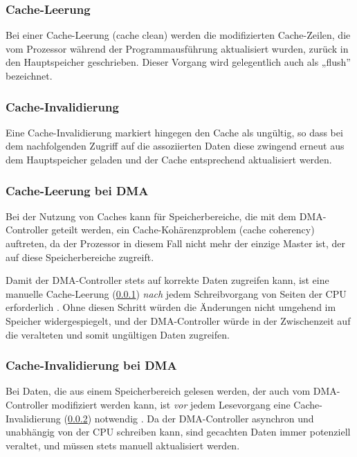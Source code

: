 \subsubsection{Cache-Leerung} \label{sec:cache_clean}

Bei einer Cache-Leerung (cache clean) werden die modifizierten Cache-Zeilen, die
vom Prozessor während der Programmausführung aktualisiert wurden, zurück in den
Hauptspeicher geschrieben. Dieser Vorgang wird gelegentlich auch als „flush”
bezeichnet.

\subsubsection{Cache-Invalidierung} \label{sec:cache_invalidate}

Eine Cache-Invalidierung markiert hingegen den Cache als ungültig, so dass bei
dem nachfolgenden Zugriff auf die assoziierten Daten diese zwingend erneut aus
dem Hauptspeicher geladen und der Cache entsprechend aktualisiert werden.

\subsubsection{Cache-Leerung bei DMA} \label{sec:cache_clean_dma}

Bei der Nutzung von Caches kann für Speicherbereiche, die mit dem DMA-Controller
geteilt werden, ein Cache-Kohärenzproblem (cache coherency) auftreten, da der
Prozessor in diesem Fall nicht mehr der einzige Master ist, der auf diese
Speicherbereiche zugreift.

Damit der DMA-Controller stets auf korrekte Daten zugreifen kann, ist eine
manuelle Cache-Leerung (\ref{sec:cache_clean}) \textit{nach} jedem
Schreibvorgang von Seiten der CPU erforderlich \cite[S. 6]{an4839}. Ohne diesen
Schritt würden die Änderungen nicht umgehend im Speicher widergespiegelt, und
der DMA-Controller würde in der Zwischenzeit auf die veralteten und somit
ungültigen Daten zugreifen.

\subsubsection{Cache-Invalidierung bei DMA}

Bei Daten, die aus einem Speicherbereich gelesen werden, der auch vom
DMA-Controller modifiziert werden kann, ist \textit{vor} jedem Lesevorgang eine
Cache-Invalidierung (\ref{sec:cache_invalidate}) notwendig
\cite{embeddedexpert_cache}. Da der DMA-Controller asynchron und unabhängig von
der CPU schreiben kann, sind gecachten Daten immer potenziell veraltet, und
müssen stets manuell aktualisiert werden.

